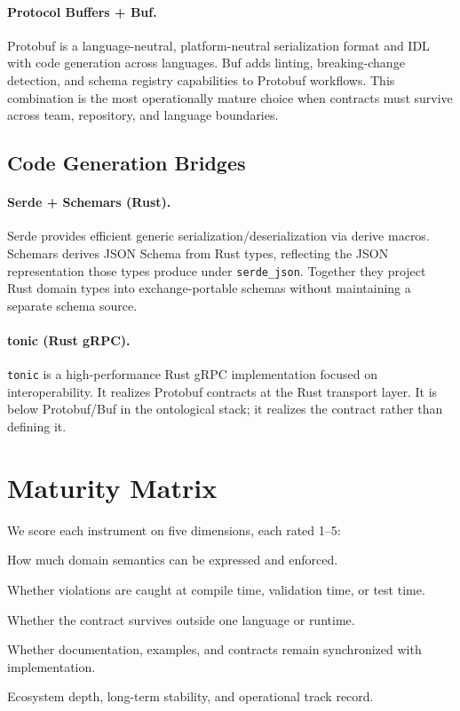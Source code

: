 \documentclass[11pt,a4paper]{article}
\theoremstyle{definition}
\begin{document}
\paragraph{Protocol Buffers + Buf.}
Protobuf is a language-neutral, platform-neutral serialization format and IDL with code generation across languages. Buf adds linting, breaking-change detection, and schema registry capabilities to Protobuf workflows. This combination is the most operationally mature choice when contracts must survive across team, repository, and language boundaries.

\subsection{Code Generation Bridges}

\paragraph{Serde + Schemars (Rust).}
Serde provides efficient generic serialization/deserialization via derive macros. Schemars derives JSON Schema from Rust types, reflecting the JSON representation those types produce under \texttt{serde\_json}. Together they project Rust domain types into exchange-portable schemas without maintaining a separate schema source.

\paragraph{tonic (Rust gRPC).}
\texttt{tonic} is a high-performance Rust gRPC implementation focused on interoperability. It realizes Protobuf contracts at the Rust transport layer. It is below Protobuf/Buf in the ontological stack; it realizes the contract rather than defining it.

\section{Maturity Matrix}

We score each instrument on five dimensions, each rated 1--5:

\begin{description}[leftmargin=2cm, labelwidth=2cm]
  \item[Precision] How much domain semantics can be expressed and enforced.
  \item[Enforcement] Whether violations are caught at compile time, validation time, or test time.
  \item[Interop] Whether the contract survives outside one language or runtime.
  \item[Drift Resistance] Whether documentation, examples, and contracts remain synchronized with implementation.
  \item[Maturity] Ecosystem depth, long-term stability, and operational track record.
\end{description}
\end{document}
